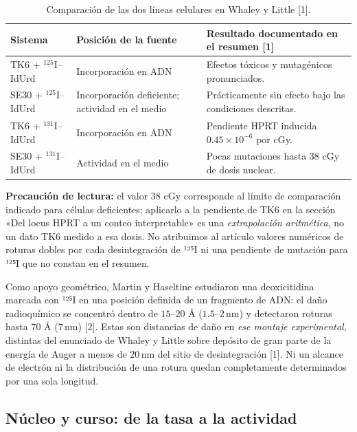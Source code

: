 \documentclass[11pt,a4paper,oneside]{article}
\begin{document}
\begin{table}[htbp]\centering\small
\begin{tabularx}{\linewidth}{@{}p{.20\linewidth}p{.28\linewidth}X@{}}
\toprule Sistema & Posición de la fuente & Resultado documentado en el resumen [1]\\\midrule
TK6 + $^{125}$I--IdUrd & Incorporación en ADN & Efectos tóxicos y mutagénicos pronunciados.\\
SE30 + $^{125}$I--IdUrd & Incorporación deficiente; actividad en el medio & Prácticamente sin efecto bajo las condiciones descritas.\\
TK6 + $^{131}$I--IdUrd & Incorporación en ADN & Pendiente HPRT inducida $0.45\times10^{-6}$ por cGy.\\
SE30 + $^{131}$I--IdUrd & Actividad en el medio & Pocas mutaciones hasta 38 cGy de dosis nuclear.\\\bottomrule
\end{tabularx}
\caption{Comparación de las dos líneas celulares en Whaley y Little [1].}
\end{table}

\textbf{Precaución de lectura:} el valor \(38\) cGy corresponde al límite de comparación indicado para células deficientes; aplicarlo a la pendiente de TK6 en la sección «Del locus HPRT a un conteo interpretable» es una \emph{extrapolación aritmética}, no un dato TK6 medido a esa dosis. No atribuimos al artículo valores numéricos de roturas dobles por cada desintegración de ¹²⁵I ni una pendiente de mutación para ¹²⁵I que no constan en el resumen.

Como apoyo geométrico, Martin y Haseltine estudiaron una deoxicitidina marcada con ¹²⁵I en una posición definida de un fragmento de ADN: el daño radioquímico se concentró dentro de \(15\)--\(20\) Å (\(1.5\)--\(2\,\mathrm{nm}\)) y detectaron roturas hasta \(70\) Å (\(7\,\mathrm{nm}\)) {[}2{]}. Estas son distancias de daño en \emph{ese montaje experimental}, distintas del enunciado de Whaley y Little sobre depósito de gran parte de la energía de Auger a menos de \(20\,\mathrm{nm}\) del sitio de desintegración {[}1{]}. Ni un alcance de electrón ni la distribución de una rotura quedan completamente determinados por una sola longitud.

\subsection{Núcleo y curso: de la tasa a la actividad}\label{nuxfacleo-y-curso-de-la-tasa-a-la-actividad}
\end{document}
